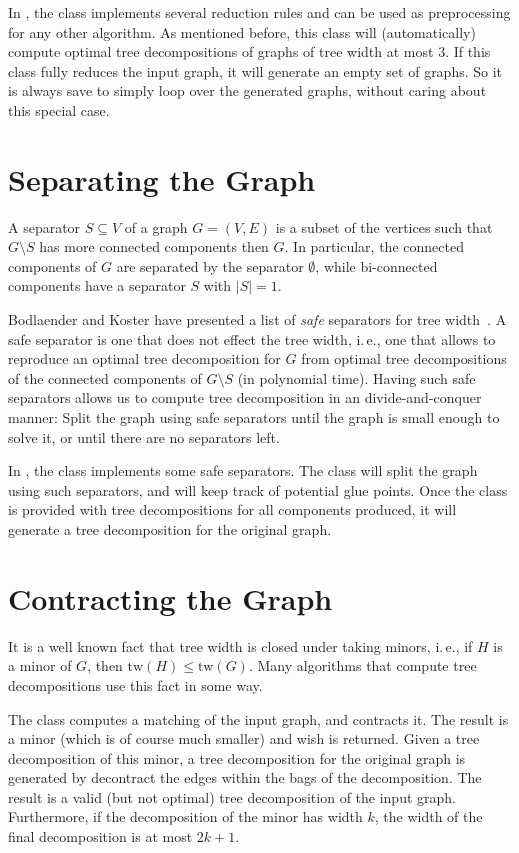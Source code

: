 \documentclass[a4paper, ukenglish, twoside, openright]{jdrasilmanual}
\begin{document}
In \Jdrasil, the class  implements several
reduction rules and can be used as preprocessing for any other
algorithm. As mentioned before, this class will (automatically)
compute optimal tree decompositions of graphs of tree width at most
$3$. If this class fully reduces the input graph, it will generate an
empty set of graphs. So it is always save to simply loop over the
generated graphs, without caring about this special case.

\section{Separating the Graph}
A separator $S\subseteq V$ of a graph $G=(V,E)$ is a subset of the
vertices such that $G\setminus S$ has more connected components
then $G$. In particular, the connected components of $G$ are separated
by the separator $\emptyset$, while bi-connected components have a
separator $S$ with $|S|=1$.

Bodlaender and Koster have presented a list of \emph{safe} separators
for tree width~\cite{BodlaenderK2006}. A safe separator is one that
does not effect the tree width, i.\,e., one that allows to reproduce
an optimal tree decomposition for $G$ from optimal tree decompositions
of the connected components of $G\setminus S$ (in polynomial
time). Having such safe separators allows us to compute tree
decomposition in an divide-and-conquer manner: Split the graph using
safe separators until the graph is small enough to solve it, or until
there are no separators left.

In \Jdrasil, the class  implements some safe
separators. The class will split the graph using such separators, and
will keep track of potential glue points. Once the class is provided
with tree decompositions for all components produced, it will generate
a tree decomposition for the original graph.

\section{Contracting the Graph}
It is a well known fact that tree width is closed under taking minors,
i.\,e., if \(H\) is a minor of \(G\), then \(\mathrm{tw}(H)\leq
\mathrm{tw}(G)\). Many algorithms that compute tree decompositions use
this fact in some way.
  
The  class computes a matching of the input graph, and
contracts it. The result is a minor (which is of course much smaller)
and wish is returned. Given a tree decomposition of this minor, a tree
decomposition for the original graph is generated by decontract the
edges within the bags of the decomposition. The result is a valid (but
not optimal) tree decomposition of the input graph. Furthermore, if
the decomposition of the minor has width \(k\), the width of the final
decomposition is at most \(2k+1\).
  
\end{document}
